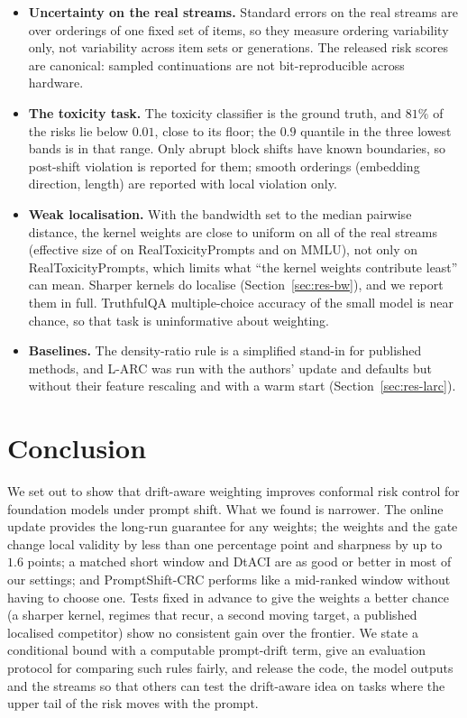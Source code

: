 \begin{itemize}[nosep]
  \item \textbf{Uncertainty on the real streams.} Standard errors on the real streams are over orderings of one fixed set of items, so they measure ordering variability only, not variability across item sets or generations. The released risk scores are canonical: sampled continuations are not bit-reproducible across hardware.
  \item \textbf{The toxicity task.} The toxicity classifier is the ground truth, and $81\%$ of the risks lie below $0.01$, close to its floor; the $0.9$ quantile in the three lowest bands is in that range. Only abrupt block shifts have known boundaries, so post-shift violation is reported for them; smooth orderings (embedding direction, length) are reported with local violation only.
  \item \textbf{Weak localisation.} With the bandwidth set to the median pairwise distance, the kernel weights are close to uniform on all of the real streams (effective size \RtpKernelNeff{} of \PoolLen{} on RealToxicityPrompts and \MmluKernelNeff{} on MMLU), not only on RealToxicityPrompts, which limits what ``the kernel weights contribute least'' can mean. Sharper kernels do localise (Section~\ref{sec:res-bw}), and we report them in full. TruthfulQA multiple-choice accuracy of the small model is near chance, so that task is uninformative about weighting.
  \item \textbf{Baselines.} The density-ratio rule is a simplified stand-in for published methods, and L-ARC \citep{zecchin2024localized} was run with the authors' update and defaults but without their feature rescaling and with a warm start (Section~\ref{sec:res-larc}).
\end{itemize}

\section{Conclusion}\label{sec:conclusion}

We set out to show that drift-aware weighting improves conformal risk control for foundation models under prompt shift. What we found is narrower. The online update provides the long-run guarantee for any weights; the weights and the gate change local validity by less than one percentage point and sharpness by up to $1.6$ points; a matched short window and DtACI are as good or better in most of our settings; and PromptShift-CRC performs like a mid-ranked window without having to choose one. Tests fixed in advance to give the weights a better chance (a sharper kernel, regimes that recur, a second moving target, a published localised competitor) show no consistent gain over the frontier. We state a conditional bound with a computable prompt-drift term, give an evaluation protocol for comparing such rules fairly, and release the code, the model outputs and the streams so that others can test the drift-aware idea on tasks where the upper tail of the risk moves with the prompt.

